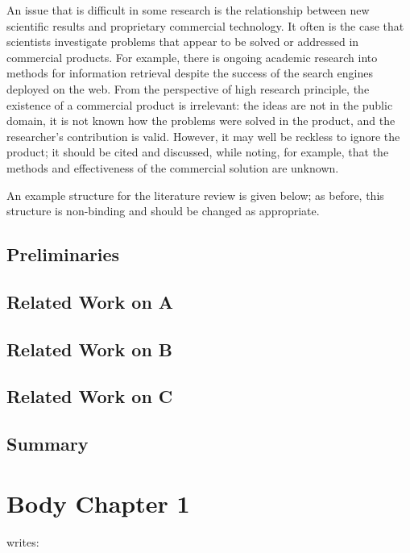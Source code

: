 \documentclass[a4paper,oneside,bibliography=totoc]{scrbook}
\begin{document}
{  An issue that is difficult in some research is the relationship between new
  scientific results and proprietary commercial technology. It often is the case
  that scientists investigate problems that appear to be solved or addressed in
  commercial products. For example, there is ongoing academic research into
  methods for information retrieval despite the success of the search engines
  deployed on the web. From the perspective of high research principle, the
  existence of a commercial product is irrelevant: the ideas are not in the
  public domain, it is not known how the problems were solved in the product,
  and the researcher's contribution is valid. However, it may well be reckless
  to ignore the product; it should be cited and discussed, while noting, for
  example, that the methods and effectiveness of the commercial solution are
  unknown. }

An example structure for the literature review is given below; as before, this
structure is non-binding and should be changed as appropriate.

\section{Preliminaries}
\label{sec:preliminaries}

\section{Related Work on A}
\label{sec:related_work_A}

\section{Related Work on B}

\section{Related Work on C}

\section{Summary}

\chapter{Body Chapter 1}
\citet{zobel2004} writes:
\end{document}
